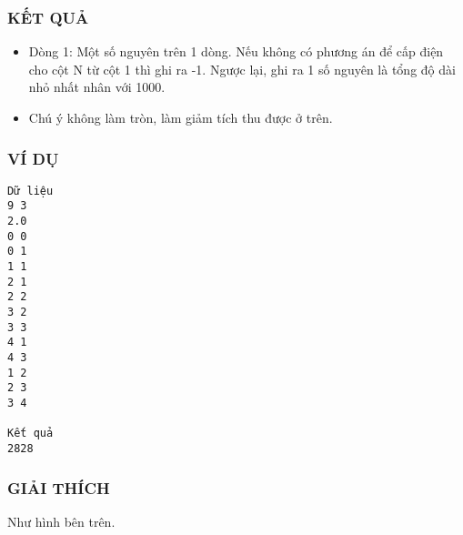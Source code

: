 \subsubsection{   KẾT QUẢ  }
\begin{itemize}
	\item     Dòng 1: Một số nguyên trên 1 dòng. Nếu không có phương án để cấp điện cho cột N từ          cột 1 thì ghi ra -1. Ngược lại, ghi ra 1 số nguyên là tổng độ dài nhỏ nhất nhân với 1000.   
	\item     Chú ý không làm tròn, làm giảm tích thu được ở trên.   
\end{itemize}

\subsubsection{   VÍ DỤ  }
\begin{verbatim}
Dữ liệu
9 3
2.0
0 0
0 1
1 1
2 1
2 2
3 2
3 3
4 1
4 3
1 2
2 3
3 4

Kết quả
2828
\end{verbatim}

\subsubsection{   GIẢI THÍCH  }

   Như hình bên trên.  
